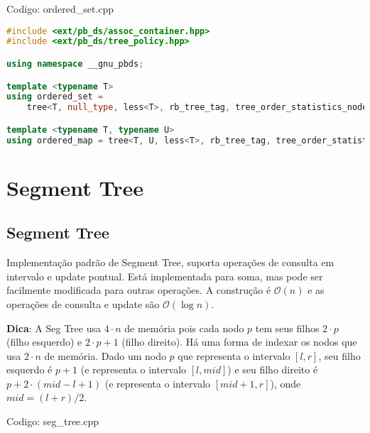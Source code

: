 \documentclass[10pt, a4paper, oneside]{book}
\begin{document}
\hfill

Codigo: ordered\_set.cpp

\begin{lstlisting}[language=C++]
#include <ext/pb_ds/assoc_container.hpp>
#include <ext/pb_ds/tree_policy.hpp>

using namespace __gnu_pbds;

template <typename T>
using ordered_set =
    tree<T, null_type, less<T>, rb_tree_tag, tree_order_statistics_node_update>;

template <typename T, typename U>
using ordered_map = tree<T, U, less<T>, rb_tree_tag, tree_order_statistics_node_update>;\end{lstlisting}
\hfill

\section{Segment Tree}
\subsection{Segment Tree}


Implementação padrão de Segment Tree, suporta operações de consulta em intervalo e update pontual. Está implementada para soma, mas pode ser facilmente modificada para outras operações. A construção é $\mathcal{O}(n)$ e as operações de consulta e update são $\mathcal{O}(\log n )$.



\textbf{Dica}: A Seg Tree usa $4 \cdot n$ de memória pois cada nodo $p$ tem seus filhos $2 \cdot p$ (filho esquerdo) e $2 \cdot p + 1$ (filho direito). Há uma forma de indexar os nodos que usa $2 \cdot n$ de memória. Dado um nodo $p$ que representa o intervalo $[l, r]$, seu filho esquerdo é $p+1$ (e representa o intervalo $[l, mid]$) e seu filho direito é $p+2 \cdot (mid-l+1)$ (e representa o intervalo $[mid+1, r]$), onde $mid = (l+r)/2$.
\hfill

Codigo: seg\_tree.cpp
\end{document}
